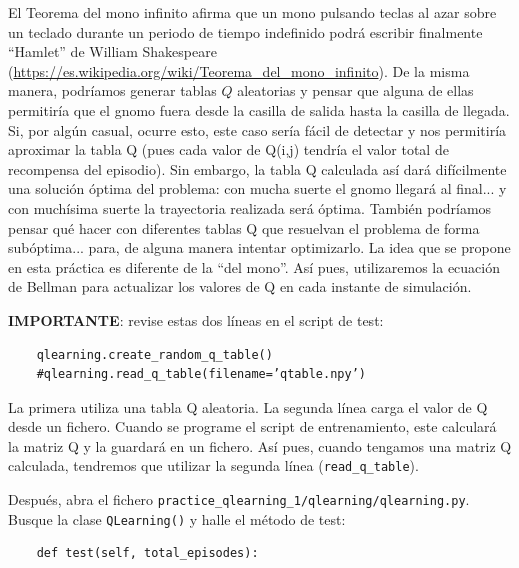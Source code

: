 \documentclass{article}
\begin{document}
El Teorema del mono infinito afirma que un mono pulsando teclas al azar sobre un teclado durante un periodo de tiempo indefinido podrá escribir finalmente ``Hamlet'' de William Shakespeare (\url{https://es.wikipedia.org/wiki/Teorema_del_mono_infinito}). De la misma manera, podríamos generar tablas $Q$ aleatorias y pensar que alguna de ellas permitiría que el gnomo fuera desde la casilla de salida hasta la casilla de llegada. Si, por algún casual, ocurre esto, este caso sería fácil de detectar y nos permitiría aproximar la tabla Q (pues cada valor de Q(i,j) tendría el valor total de recompensa del episodio). Sin embargo, la tabla Q calculada así dará difícilmente una solución óptima del problema: con mucha suerte el gnomo llegará al final... y con muchísima suerte la trayectoria realizada será óptima. También podríamos pensar qué hacer con diferentes tablas Q que resuelvan el problema de forma subóptima... para, de alguna manera intentar optimizarlo. La idea que se propone en esta práctica es diferente de la ``del mono''. Así pues, utilizaremos la ecuación de Bellman para actualizar los valores de Q en cada instante de simulación.

\textbf{IMPORTANTE}: revise estas dos líneas en el script de test:
\begin{verbatim}
    qlearning.create_random_q_table()
    #qlearning.read_q_table(filename=’qtable.npy’)
\end{verbatim}
La primera utiliza una tabla Q aleatoria. La segunda línea carga el valor de Q desde un fichero. Cuando se programe el script de entrenamiento, este calculará la matriz Q y la guardará en un fichero. Así pues, cuando tengamos una matriz Q calculada, tendremos que utilizar la segunda línea (\texttt{read\_q\_table}).



Después, abra el fichero \texttt{practice\_qlearning\_1/qlearning/qlearning.py}. Busque la clase \texttt{QLearning()} y halle el método de test:
\begin{verbatim}
    def test(self, total_episodes):
\end{verbatim}
\end{document}
